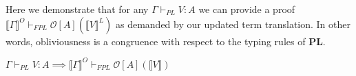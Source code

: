 \documentclass[acmsmall]{acmart}
\newcommand{\den}[1]{\llbracket #1\rrbracket}
\newcommand{\pl}{$\mathbf{PL}$}
\begin{document}
\newcommand{\Case}[1]{%
  \par\indent{ Case:} #1\par%
}
Here we demonstrate that for any $\Gamma \vdash_{PL} V : A$ we can provide a proof $\den{\Gamma}^O \vdash_{FPL} \mathcal{O}[A](\den{V}^L)$ as demanded by our updated term translation. In other words, obliviousness is a congruence with respect to the typing rules of \pl.
\begin{lemma}
  \label{lem:OblivTerm}
  $\Gamma \vdash_{PL} V : A \implies \den{\Gamma}^O \vdash_{FPL} \mathcal{O}[A](\den{V})$
\end{lemma}
\end{document}
